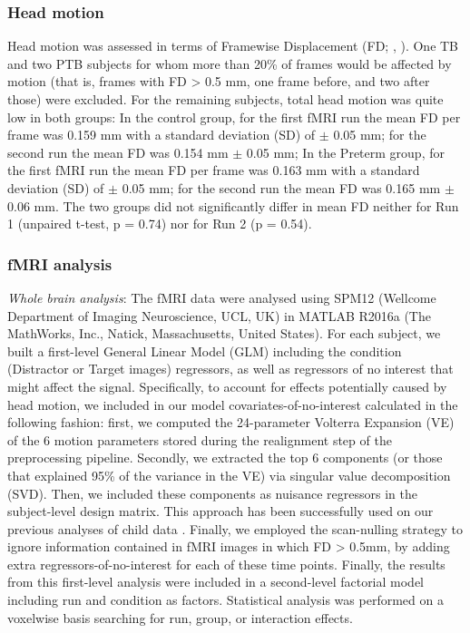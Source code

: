 \subsubsection{Head motion} 
Head motion was assessed in terms of Framewise Displacement (FD; \citeauthor{Power2014a}, \citeyear{Power2014a}). One TB and two PTB subjects for whom more than 20\% of frames would be affected by motion (that is, frames with FD > 0.5 mm, one frame before, and two after those) were excluded. For the remaining subjects, total head motion was quite low in both groups: In the control group, for the first fMRI run the mean FD per frame was 0.159 mm with a standard deviation (SD) of $\pm$ 0.05 mm; for the second run the mean FD was 0.154 mm $\pm$ 0.05 mm; In the Preterm group, for the first fMRI run the mean FD per frame was 0.163 mm with a standard deviation (SD) of $\pm$ 0.05 mm; for the second run the mean FD was 0.165 mm $\pm$ 0.06 mm. The two groups did not significantly differ in mean FD neither for Run 1 (unpaired t-test, p = 0.74) nor for Run 2 (p = 0.54).

\subsubsection{fMRI analysis}
\textit{Whole brain analysis}: The fMRI data were analysed using SPM12 (Wellcome Department of Imaging Neuroscience, UCL, UK) in MATLAB R2016a (The MathWorks, Inc., Natick, Massachusetts, United States). For each subject, we built a first-level General Linear Model (GLM) including the condition (Distractor or Target images) regressors, as well as regressors of no interest that might affect the signal. Specifically, to account for effects potentially caused by head motion, we included in our model covariates-of-no-interest calculated in the following fashion: first, we computed the 24-parameter Volterra Expansion (VE) of the 6 motion parameters stored during the realignment step of the preprocessing pipeline. Secondly, we extracted the top 6 components (or those that explained 95\% of the variance in the VE) via singular value decomposition (SVD). Then, we included these components as nuisance regressors in the subject-level design matrix. This approach has been successfully used on our previous analyses of child data \citep{Adam-Darque2018, Liverani2020}. Finally, we employed the scan-nulling strategy \citep{Lemieux2007} to ignore information contained in fMRI images in which FD > 0.5mm, by adding extra regressors-of-no-interest for each of these time points. Finally, the results from this first-level analysis were included in a second-level factorial model including run and condition as factors. Statistical analysis was performed on a voxelwise basis searching for run, group, or interaction effects.



